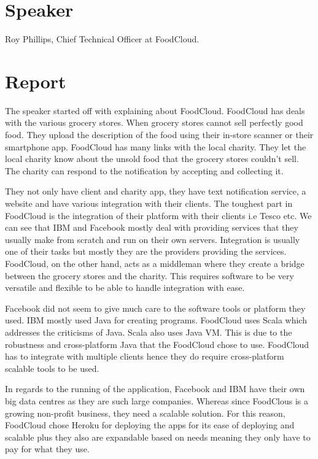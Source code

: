 
\section{Speaker}

Roy Phillips, Chief Technical Officer at FoodCloud.

\section{Report}

The speaker started off with explaining about FoodCloud. FoodCloud has deals with the various grocery stores. When grocery stores cannot sell perfectly good food. They upload the description of the food using their in-store scanner or their smartphone app. FoodCloud has many links with the local charity. They let the local charity know about the unsold food that the grocery stores couldn't sell. The charity can respond to the notification by accepting and collecting it.

They not only have client and charity app, they have text notification service, a website and have various integration with their clients. The toughest part in FoodCloud is the integration of their platform with their clients i.e Tesco etc. We can see that IBM and Facebook mostly deal with providing services that they usually make from scratch and run on their own servers. Integration is usually one of their tasks but mostly they are the providers providing the services. FoodCloud, on the other hand, acts as a middleman where they create a bridge between the grocery stores and the charity. This requires software to be very versatile and flexible to be able to handle integration with ease.

Facebook did not seem to give much care to the software tools or platform they used. IBM mostly used Java for creating programs. FoodCloud uses Scala which addresses the criticisms of Java. Scala also uses Java VM. This is due to the robustness and cross-platform Java that the FoodCloud chose to use. FoodCloud has to integrate with multiple clients hence they do require cross-platform scalable tools to be used.

In regards to the running of the application, Facebook and IBM have their own big data centres as they are such large companies. Whereas since FoodClous is a growing non-profit business, they need a scalable solution. For this reason, FoodCloud chose Heroku for deploying the apps for its ease of deploying and scalable plus they also are expandable based on needs meaning they only have to pay for what they use.

